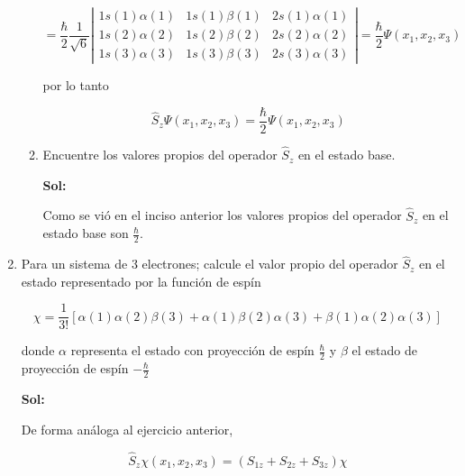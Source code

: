 \documentclass[12pt,a4paper]{article}
\begin{document}
\begin{enumerate}
\begin{enumerate}
    \begin{equation*}
        = \frac{\hbar}{2} \frac{1}{\sqrt{6}} \left| \begin{matrix}
        1s(1)\alpha(1) & 1s(1) \beta(1) & 2s(1) \alpha(1) \\
        1s(2)\alpha (2) & 1s(2) \beta(2) & 2s(2) \alpha(2) \\
        1s(3) \alpha(3) & 1s(3) \beta (3) & 2s(3) \alpha (3)
        
        \end{matrix} \right| = \frac{\hbar}{2} \Psi (x_1,x_2,x_3) 
    \end{equation*}
    
    
    por lo tanto
    
    \begin{equation*}
        \hat{S}_z \Psi(x_1,x_2,x_3) = \frac{\hbar}{2} \Psi(x_1,x_2,x_3)
    \end{equation*}
    
    
    
    
    
    
    
    \item Encuentre los valores propios del operador $\hat{S}_z$ en el estado base.
    
    \textbf{Sol:}
    
    Como se vió en el inciso anterior los valores propios del operador $\hat{S}_z$ en el estado base son $\frac{\hbar}{2}$.
    
\end{enumerate}






\item Para un sistema de 3 electrones; calcule el valor propio del operador $\hat{S}_z$ en el estado representado por la función de espín

\begin{equation*}
    \chi = \frac{1}{3!} [\alpha (1) \alpha (2) \beta (3) + \alpha (1) \beta(2) \alpha(3) + \beta(1) \alpha(2) \alpha(3)]
\end{equation*}

donde $\alpha$ representa el estado con proyección de espín $\frac{\hbar
}{2}$ y $\beta$ el estado de proyección de espín $- \frac{\hbar}{2}$

\textbf{Sol:}

De forma análoga al ejercicio anterior,

\begin{equation*}
        \hat{S}_z \chi (x_1,x_2,x_3) =  (S_{1z} + S_{2z} + S_{3z}) \chi 
    \end{equation*}
    

\end{enumerate}
\end{document}
